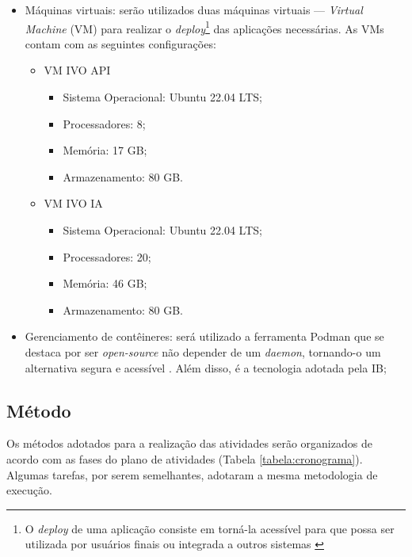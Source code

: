 \documentclass[
	12pt,				%
	a4paper,			%
	english,			%
	brazil,				%
	]{article}
\begin{document}
\begin{itemize}
	\item Máquinas virtuais: serão utilizados duas máquinas virtuais — \textit{Virtual Machine} (VM) para realizar o \textit{deploy}\footnote{O \textit{deploy} de uma aplicação consiste em torná-la acessível para que possa ser utilizada por usuários finais ou integrada a outros sistemas \cite{ibm2025}} das aplicações necessárias. As VMs contam com as seguintes configurações:
		\begin{itemize}
			\item VM IVO API
				\begin{itemize}
					\item Sistema Operacional: Ubuntu 22.04 LTS;
					\item Processadores: 8;
					\item Memória: 17 GB;
					\item Armazenamento: 80 GB.
				\end{itemize}
			\item VM IVO IA	
				\begin{itemize}
					\item Sistema Operacional: Ubuntu 22.04 LTS;
					\item Processadores: 20;
					\item Memória: 46 GB;
					\item Armazenamento: 80 GB.
				\end{itemize}
		\end{itemize}
		
		
	\item Gerenciamento de contêineres: será utilizado a ferramenta Podman que se destaca por ser \textit{open-source} não depender de um \textit{daemon}, tornando-o um alternativa segura e acessível \cite{redhat2024}. Além disso, é a tecnologia adotada pela IB;
\end{itemize}


\subsection{Método}

Os métodos adotados para a realização das atividades serão organizados de acordo com as fases do plano de atividades (Tabela \ref{tabela:cronograma}). Algumas tarefas, por serem semelhantes, adotaram a mesma metodologia de execução.
\end{document}
